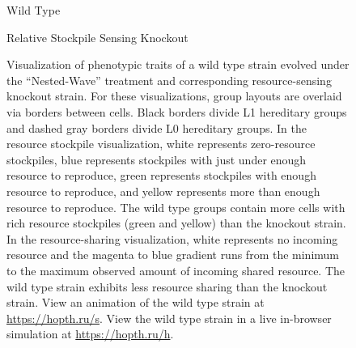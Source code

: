 \begin{figure}[!htbp]
\begin{center}
\vspace{1.0ex}

\hspace*{\fill}%
\begin{minipage}[t]{0.05\columnwidth}
\vspace{0pt} %
\end{minipage}%
\hfill
\begin{minipage}[t]{0.45\columnwidth}
\centering
\vspace{0pt} %
Wild Type
\end{minipage}%
\hfill
\begin{minipage}[t]{0.45\columnwidth}
\centering
\vspace{0pt} %
Relative Stockpile Sensing Knockout
\end{minipage}%
\hspace*{\fill}

\vspace{1.0ex}

\caption{
Visualization of phenotypic traits of a wild type strain evolved under the ``Nested-Wave'' treatment and corresponding resource-sensing knockout strain.
For these visualizations, group layouts are overlaid via borders between cells.
Black borders divide L1 hereditary groups and dashed gray borders divide L0 hereditary groups.
In the resource stockpile visualization, white represents zero-resource stockpiles, blue represents stockpiles with just under enough resource to reproduce, green represents stockpiles with enough resource to reproduce, and yellow represents more than enough resource to reproduce.
The wild type groups contain more cells with rich resource stockpiles (green and yellow) than the knockout strain.
In the resource-sharing visualization, white represents no incoming resource and the magenta to blue gradient runs from the minimum to the maximum observed amount of incoming shared resource.
The wild type strain exhibits less resource sharing than the knockout strain.
View an animation of the wild type strain at \url{https://hopth.ru/s}.
View the wild type strain in a live in-browser simulation at \url{https://hopth.ru/h}.
}
\label{fig:ko-stockpiletrigger-sharing}
\end{center}
\end{figure}

